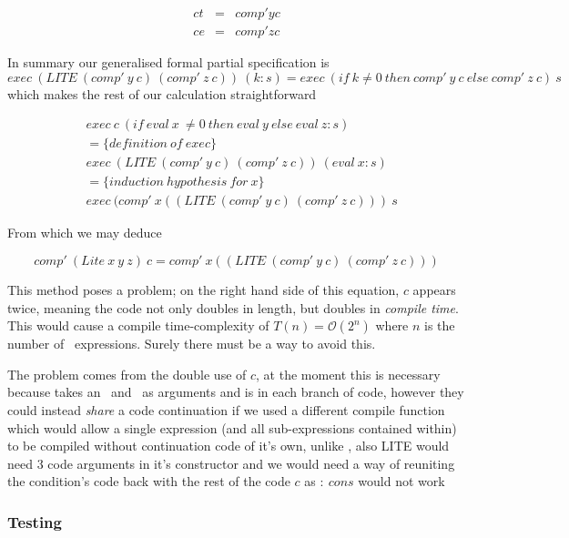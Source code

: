 \documentclass {article}
\begin{document}
\begin{eqnarray*}
	ct &=& comp' y c \\
	ce &=& comp' z c
\end{eqnarray*}

In summary our generalised formal partial specification is
\begin{equation*}
	exec \ (LITE \ (comp' \ y \ c) \ (comp' \ z \ c) ) \ (k:s) = exec \ (if \ k \not= 0 \ then \ comp' \ y \ c \ else \ comp' \ z \ c) \ s 
\end{equation*}
which makes the rest of our calculation straightforward

\begin{align*}
	&exec \ c \ (if \ eval \ x \ \not= 0 \ then \ eval \ y \ else \ eval \ z : s) \\
	&= \{definition \ of \ exec \} \\
	&exec \ (LITE \ (comp' \ y \ c) \ (comp' \ z \ c) ) \ (eval \ x : s) \\
	&= \{induction \ hypothesis \ for \ x\} \\
	&exec \ (comp' \ x ((LITE \ (comp' \ y \ c) \ (comp' \ z \ c))) \ s
\end{align*}

From which we may deduce 

	\[ comp' \ (Lite \ x \ y \ z) \ c = comp' \ x ((LITE \ (comp' \ y \ c) \ (comp' \ z \ c))) \]

This method poses a problem;
on the right hand side of this equation,
$c$ appears twice, meaning the code not only 
doubles in length, but doubles in \emph{compile time}.
This would cause a compile time-complexity of
\( T(n) = \mathcal{O}(2^n) \)
where $n$ is the number of \lite\ expressions.
Surely there must be a way to avoid this.

The problem comes from the double use of $c$,
at the moment this is necessary because \compp
takes an \expr\ and \code\ as arguments and is in
each branch of code,
however they could instead \emph{share}
a code continuation if we used a different compile function
which would allow a single expression 
(and all sub-expressions contained within)  
to be compiled without continuation code of it's own,
unlike \compp, also LITE would need 3 code arguments in
it's constructor and we would need a way of 
reuniting the condition's code back with the rest of the code $c$
as $: \ cons$ would not work

\subsubsection*{Testing}
\end{document}
